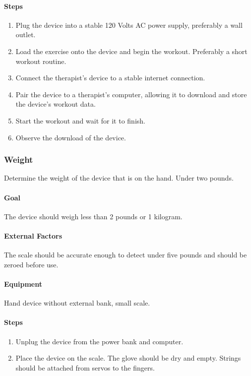 \documentclass{article}
\begin{document}
\paragraph{Steps}
\begin{enumerate}
\item Plug the device into a stable 120 Volts AC power supply, preferably a wall outlet.
\item Load the exercise onto the device and begin the workout. Preferably a short workout routine.
\item Connect the therapist's device to a stable internet connection.
\item Pair the device to a therapist's computer, allowing it to download and store the device's workout data.
\item Start the workout and wait for it to finish.
\item Observe the download of the device.
\end{enumerate}

\subsubsection{Weight}
Determine the weight of the device that is on the hand. Under two pounds.

\paragraph{Goal} The device should weigh less than 2 pounds or 1 kilogram.

\paragraph{External Factors} The scale should be accurate enough to detect under five pounds and should be zeroed before use.

\paragraph{Equipment} Hand device without external bank, small scale.

\paragraph{Steps}
\begin{enumerate}
\item Unplug the device from the power bank and computer.
\item Place the device on the scale. The glove should be dry and empty. Strings should be attached from servos to the fingers.
\end{enumerate}
\end{document}
